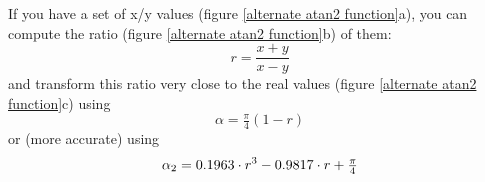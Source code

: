 If you have a set of x/y values (figure \ref{alternate atan2 function}a), you can compute the ratio (figure \ref{alternate atan2 function}b) of them:
\begin{equation}
	r = \frac{x+y}{x-y}
\end{equation}
and transform this ratio very close to the real values (figure \ref{alternate atan2 function}c) using
\begin{equation}
	\alpha = \tfrac \pi 4 (1-r)
\end{equation}
or (more accurate) using
\begin{equation}
	\alpha_2 = 0.1963 \cdot r^3 -0.9817 \cdot r + \tfrac \pi 4
\end{equation}
